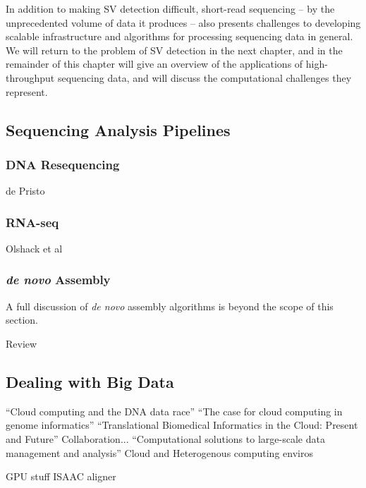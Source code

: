 In addition to making SV detection difficult, short-read sequencing -- by the unprecedented volume of data it produces -- also presents challenges to developing scalable infrastructure and algorithms for processing sequencing data in general. We will return to the problem of SV detection in the next chapter, and in the remainder of this chapter will give an overview of the applications of high-throughput sequencing data, and will discuss the computational challenges they represent.

\subsection{Sequencing Analysis Pipelines}\label{section_pipelines}

\subsubsection{DNA Resequencing}

de Pristo\cite{DePristo:2011fo}

\subsubsection{RNA-seq}

Olshack et al\cite{Oshlack:2010kr}

\subsubsection{\emph{de novo} Assembly}

A full discussion of \emph{de novo} assembly algorithms is beyond the scope of this section.

Review\cite{Nagarajan:2013cq}

\subsection{Dealing with Big Data}

``Cloud computing and the DNA data race''\cite{Schatz:2010js}
``The case for cloud computing in genome informatics''\cite{Stein:2010gp}
``Translational Biomedical Informatics in the Cloud: Present and Future''\cite{Chen:2013ci} Collaboration...
``Computational solutions to large-scale data management and analysis''\cite{Schadt:2010dp} Cloud and Heterogenous computing enviros


GPU stuff
ISAAC aligner~\cite{Raczy:2013hy}